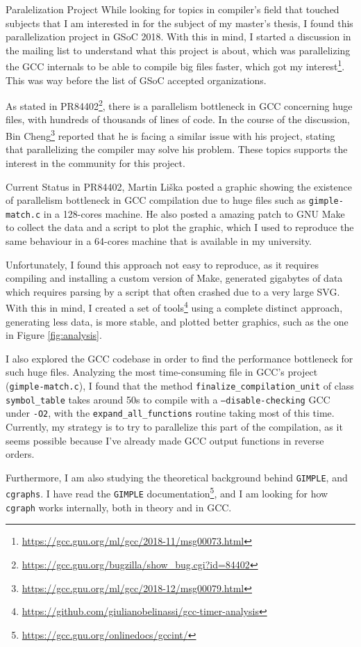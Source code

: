 \documentclass[12pt]{article}
\begin{document}
\begin{section}{Paralelization Project}
While looking for topics in compiler's field that touched subjects that I
am interested in for the subject of my master's thesis, I found this
parallelization project in GSoC 2018. With this in mind, I started a
discussion in the mailing list to understand what this project is about,
which was parallelizing the GCC internals to be able to compile big files
faster, which got my
interest\footnote{\url{https://gcc.gnu.org/ml/gcc/2018-11/msg00073.html}}.
This was way before the list of GSoC accepted organizations.

As stated in PR84402\footnote{\url{https://gcc.gnu.org/bugzilla/show\_bug.cgi?id=84402}},
there is a parallelism bottleneck in GCC concerning huge files, with hundreds of
thousands of lines of code. In the course of the discussion,
Bin Cheng\footnote{\url{https://gcc.gnu.org/ml/gcc/2018-12/msg00079.html}}
reported that
he is facing a similar issue with his project, stating that parallelizing the
compiler may solve his problem. These topics supports the interest in the
community for this project.

\end{section}

\begin{subsection}{Current Status}
in PR84402, Martin Liška posted a graphic showing the existence of
parallelism bottleneck in GCC compilation due to huge files such as
\texttt{gimple-match.c} in a 128-cores machine. He also posted a amazing patch to
GNU Make to collect the data and a script to plot the graphic, which I used
to reproduce the same behaviour in a 64-cores machine that is available in
my university.

Unfortunately, I found this approach not easy to reproduce, as
it requires compiling and installing a custom version of Make, generated
gigabytes of data which requires parsing by a script that often crashed due
to a very large SVG. With this in mind, I created a set of
tools\footnote{\url{https://github.com/giulianobelinassi/gcc-timer-analysis}}
using a complete distinct approach, generating less data, is more stable, and
plotted better graphics, such as the one in Figure \ref{fig:analysis}.

I also explored the GCC codebase in order to find the performance bottleneck for
such huge files. Analyzing the most time-consuming file in GCC's project
(\texttt{gimple-match.c}), I found that the method
\texttt{finalize\_compilation\_unit} of
class \texttt{symbol\_table} takes around 50s to compile with a
\texttt{--disable-checking} GCC under \texttt{-O2}, with the \texttt{expand\_all\_functions}
routine taking most of this time. Currently, my strategy is to try to parallelize
this part of the compilation, as it seems possible because I've already made GCC output
functions in reverse orders.

Furthermore, I am also studying the theoretical background behind \texttt{GIMPLE},
    and \texttt{cgraphs}. I have read the \texttt{GIMPLE}
documentation\footnote{\url{https://gcc.gnu.org/onlinedocs/gccint/}}, and
I am looking for how \texttt{cgraph} works internally, both in theory and in
GCC.

\end{subsection}
\end{document}
